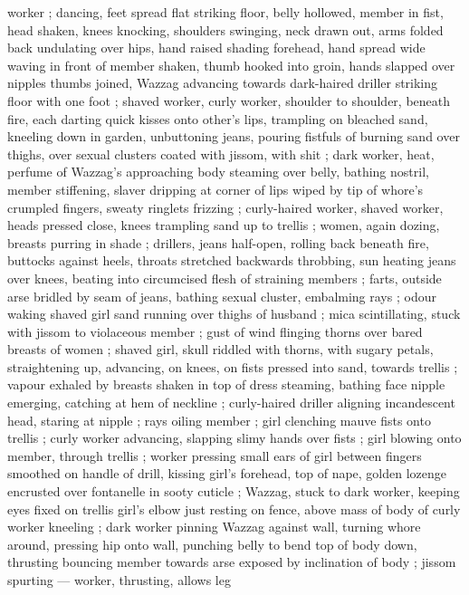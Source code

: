 worker ; dancing, feet spread flat striking floor, belly hollowed, member in fist, head shaken, knees knocking, shoulders swinging, neck drawn out, arms folded back undulating over hips, hand raised shading forehead, hand spread wide waving in front of member shaken, thumb hooked into groin, hands slapped over nipples thumbs joined, Wazzag advancing towards dark-haired driller striking floor with one foot ; shaved worker, curly worker, shoulder to shoulder, beneath fire, each darting quick kisses onto other's lips, trampling on bleached sand, kneeling down in garden, unbuttoning jeans, pouring fistfuls of burning sand over thighs, over sexual clusters coated with jissom, with shit ; dark worker, heat, perfume of Wazzag's approaching body steaming over belly, bathing nostril, member stiffening, slaver dripping at corner of lips wiped by tip of whore's crumpled fingers, sweaty ringlets frizzing ; curly-haired worker, shaved worker, heads pressed close, knees trampling sand up to trellis ; women, again dozing, breasts purring in shade ; drillers, jeans half-open, rolling back beneath fire, buttocks against heels, throats stretched backwards throbbing, sun heating jeans over knees, beating into circumcised flesh of straining members ; farts, outside arse bridled by seam of jeans, bathing sexual cluster, embalming rays ; odour waking shaved girl {\col} sand running over thighs of husband ; mica scintillating, stuck with jissom to violaceous member ; gust of wind flinging thorns over bared breasts of women ; shaved girl, skull riddled with thorns, with sugary petals, straightening up, advancing, on knees, on fists pressed into sand, towards trellis ; vapour exhaled by breasts shaken in top of dress steaming, bathing face {\col} nipple emerging, catching at hem of neckline ; curly-haired driller aligning incandescent head, staring at nipple ; rays oiling member ; girl clenching mauve fists onto trellis ; curly worker advancing, slapping slimy hands over fists ; girl blowing onto member, through trellis ; worker pressing small ears of girl between fingers smoothed on handle of drill, kissing girl's forehead, top of nape, golden lozenge encrusted over fontanelle in sooty cuticle ; Wazzag, stuck to dark worker, keeping eyes fixed on trellis {\col}
girl's elbow just resting on fence, above mass of body of curly 
worker kneeling ; dark worker pinning Wazzag against wall, turning 
whore around, pressing hip onto wall, punching belly to bend top of 
body down, thrusting bouncing member towards arse exposed by 
inclination of body ; jissom spurting --- worker, thrusting, allows leg 
